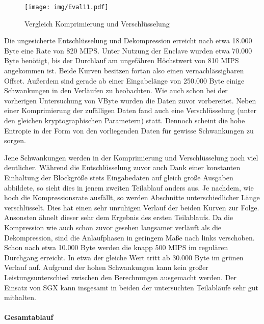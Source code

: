\begin{figure}[H]
	\texttt{[image: img/Eval11.pdf]}
	\centering
	\caption{Vergleich Komprimierung und Verschlüsselung}
	\label{fig:eval11}
\end{figure}

Die ungesicherte Entschlüsselung und Dekompression erreicht nach etwa 18.000 Byte eine Rate von 820 \ac{MIPS}. Unter Nutzung der Enclave wurden etwa 70.000 Byte benötigt, bis der Durchlauf am ungefähren Höchstwert von 810 \ac{MIPS} angekommen ist. Beide Kurven besitzen fortan also einen vernachlässigbaren Offset. Außerdem sind gerade ab einer Eingabelänge von 250.000 Byte einige Schwankungen in den Verläufen zu beobachten. Wie auch schon bei der vorherigen Untersuchung von VByte wurden die Daten zuvor vorbereitet. Neben einer Komprimierung der zufälligen Daten fand auch eine Verschlüsselung (unter den gleichen kryptographischen Parametern) statt. Dennoch scheint die hohe Entropie in der Form von den vorliegenden Daten für gewisse Schwankungen zu sorgen.

Jene Schwankungen werden in der Komprimierung und Verschlüsselung noch viel deutlicher. Während die Entschlüsselung zuvor auch Dank einer konstanten Einhaltung der Blockgröße stets Eingabedaten auf gleich große Ausgaben abbildete, so sieht dies in jenem zweiten Teilablauf anders aus. Je nachdem, wie hoch die Kompressionsrate ausfällt, so werden Abschnitte unterschiedlicher Länge verschlüsselt. Dies hat einen sehr unruhigen Verlauf der beiden Kurven zur Folge. Ansonsten ähnelt dieser sehr dem Ergebnis des ersten Teilablaufs. Da die Kompression wie auch schon zuvor gesehen langsamer verläuft als die Dekompression, sind die Anlaufphasen in geringem Maße nach links verschoben. Schon nach etwa 10.000 Byte werden die knapp 500 \ac{MIPS} im regulären Durchgang erreicht. In etwa der gleiche Wert tritt ab 30.000 Byte im grünen Verlauf auf. Aufgrund der hohen Schwankungen kann kein großer Leistungsunterschied zwischen den Berechnungen ausgemacht werden. Der Einsatz von \ac{SGX} kann insgesamt in beiden der untersuchten Teilabläufe sehr gut mithalten.

\paragraph{Gesamtablauf}

